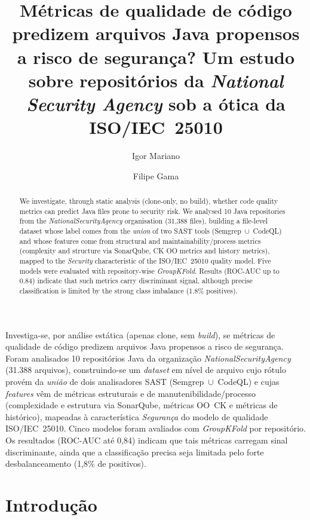\documentclass[12pt]{article}
\title{Métricas de qualidade de código predizem arquivos Java propensos a
risco de segurança? Um estudo sobre repositórios da \textit{National
Security Agency} sob a ótica da ISO/IEC~25010}
\author{Igor Mariano\inst{1} \and Filipe Gama\inst{2}}
\begin{document}
\maketitle

\begin{resumo}
Investiga-se, por análise estática (apenas clone, sem \textit{build}), se
métricas de qualidade de código predizem arquivos Java propensos a risco de
segurança. Foram analisados 10 repositórios Java da organização
\textit{NationalSecurityAgency} (31.388 arquivos), construindo-se
um \textit{dataset} em nível de arquivo cujo rótulo provém da \emph{união} de
dois analisadores SAST (Semgrep~$\cup$~CodeQL) e cujas \textit{features} vêm de
métricas estruturais e de manutenibilidade/processo (complexidade e estrutura
via SonarQube, métricas OO~CK e métricas de histórico), mapeadas à característica
\emph{Segurança} do modelo de qualidade ISO/IEC~25010. Cinco modelos foram
avaliados com \textit{GroupKFold} por repositório. Os resultados (ROC-AUC até
0,84) indicam que tais métricas carregam sinal discriminante, ainda que a
classificação precisa seja limitada pelo forte desbalanceamento (1,8\% de
positivos).
\end{resumo}

\begin{abstract}
We investigate, through static analysis (clone-only, no build), whether code
quality metrics can predict Java files prone to security risk. We analysed 10
Java repositories from the \textit{NationalSecurityAgency} organisation (31,388
files), building a file-level dataset whose label comes from the \emph{union} of
two SAST tools (Semgrep~$\cup$~CodeQL) and whose features come from structural
and maintainability/process metrics (complexity and structure via SonarQube, CK
OO metrics and history metrics), mapped to the \emph{Security} characteristic of
the ISO/IEC~25010 quality model. Five models were evaluated with repository-wise
\textit{GroupKFold}. Results (ROC-AUC up to 0.84) indicate that such metrics
carry discriminant signal, although precise classification is limited by the
strong class imbalance (1.8\% positives).
\end{abstract}

\section{Introdução}
\end{document}
